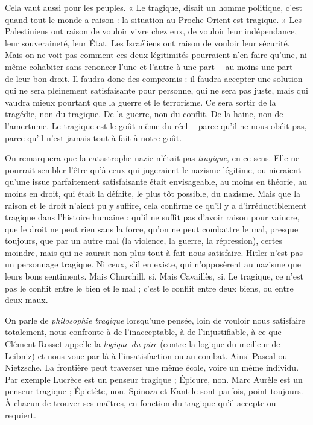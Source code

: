 Cela vaut aussi pour les peuples. « Le tragique, disait un homme politique,
c’est quand tout le monde a raison : la situation au Proche-Orient est
tragique. » Les Palestiniens ont raison de vouloir vivre chez eux, de vouloir
leur indépendance, leur souveraineté, leur État. Les Israéliens ont raison de
vouloir leur sécurité. Mais on ne voit pas comment ces deux légitimités pourraient
n’en faire qu’une, ni même cohabiter sans renoncer l’une et l’autre à
une part {\bf --} au moins une part {\bf --} de leur bon droit. Il faudra donc des
compromis : il faudra accepter une solution qui ne sera pleinement satisfaisante
pour personne, qui ne sera pas juste, mais qui vaudra mieux pourtant
que la guerre et le terrorisme. Ce sera sortir de la tragédie, non du tragique.
De la guerre, non du conflit. De la haine, non de l’amertume. Le tragique est
le goût même du réel {\bf --} parce qu’il ne nous obéit pas, parce qu’il n’est jamais
tout à fait à notre goût.

On remarquera que la catastrophe nazie n’était pas {\it tragique}, en ce sens.
Elle ne pourrait sembler l’être qu’à ceux qui jugeraient le nazisme légitime,
ou nieraient qu'une issue parfaitement satisfaisante était envisageable, au
moins en théorie, au moins en droit, qui était la défaite, le plus tôt possible,
du nazisme. Mais que la raison et le droit n’aient pu y suffire, cela confirme
ce qu’il y a d’irréductiblement tragique dans l’histoire humaine : qu’il ne
suffit pas d’avoir raison pour vaincre, que le droit ne peut rien sans la force,
qu’on ne peut combattre le mal, presque toujours, que par un autre mal (la
violence, la guerre, la répression), certes moindre, mais qui ne saurait non
plus tout à fait nous satisfaire. Hitler n’est pas un personnage tragique. Ni
ceux, s’il en existe, qui n’opposèrent au nazisme que leurs bons sentiments.
Mais Churchill, si. Mais Cavaillès, si. Le tragique, ce n’est pas le conflit entre
le bien et le mal ; c’est le conflit entre deux biens, ou entre deux maux.

On parle de {\it philosophie tragique} lorsqu’une pensée, loin de vouloir nous
satisfaire totalement, nous confronte à de l’inacceptable, à de l’injustifiable, à ce
que Clément Rosset appelle la {\it logique du pire} (contre la logique du meilleur de
Leibniz) et nous voue par là à l’insatisfaction ou au combat. Ainsi Pascal ou
Nietzsche. La frontière peut traverser une même école, voire un même individu.
Par exemple Lucrèce est un penseur tragique ; Épicure, non. Marc Aurèle
est un penseur tragique ; Épictète, non. Spinoza et Kant le sont parfois, point
toujours. À chacun de trouver ses maîtres, en fonction du tragique qu’il accepte
ou requiert.

